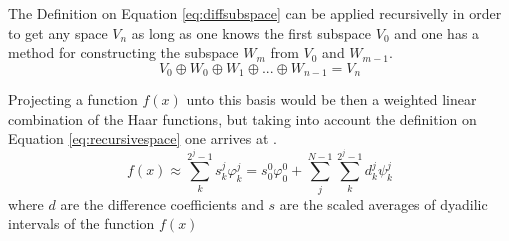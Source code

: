 \documentclass[../master_thesis.tex]{subfiles}
\begin{document}
The Definition on Equation \ref{eq:diffsubspace} can be applied recursivelly in order to
get any space $V_n$ as long as one knows the first subspace $V_0$ and one has a method for constructing the
subspace $W_m$ from $V_0$ and $W_{m-1}$.
\begin{equation}
    V_0 \oplus W_0 \oplus W_1 \oplus ... \oplus W_{n-1}  = V_n \label{eq:recursivespace}
\end{equation}

Projecting a function $f(x)$ unto this basis would be then a weighted linear combination
of the Haar functions, but taking into account the definition on Equation \ref{eq:recursivespace} one arrives
at \cite{Sorland}.
\begin{equation}\label{eq:projectftohaar}
  f(x)\approx \sum^{2^j -1}_k s^j_k\varphi^j_k = s^0_0\varphi^0_0 + \sum^{N - 1}_j\sum^{2^j -1}_k d^j_k\psi^j_k
\end{equation}
where $d$ are the difference coefficients and $s$ are the scaled averages of dyadilic intervals of the function $f(x)$
\end{document}
